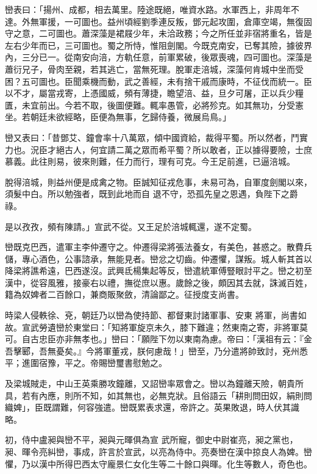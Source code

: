 \begin{pinyinscope}
 巒表曰：「揚州、成都，相去萬里。陸途既絕，唯資水路。水軍西上，非周年不達。外無軍援，一可圖也。益州頃經劉季連反叛，鄧元起攻圍，倉庫空竭，無復固守之意，二可圖也。蕭深藻是裙屐少年，未洽政務；今之所任並非宿將重名，皆是左右少年而已，三可圖也。蜀之所恃，惟阻劍閣。今既克南安，已奪其險，據彼界內，三分已一。從南安向涪，方軌任意，前軍累破，後眾喪魂，四可圖也。深藻是蕭衍兄子，骨肉至親，若其逃亡，當無死理。脫軍走涪城，深藻何肯城中坐而受困？五可圖也。臣聞乘機而動，武之善經，未有捨干戚而康時，不征伐而統一。臣
 以不才，屬當戎寄，上憑國威，頻有薄捷，瞻望涪、益，旦夕可屠，正以兵少糧匱，未宜前出。今若不取，後圖便難。輒率愚管，必將殄克。如其無功，分受憲坐。若朝廷未欲經略，臣便為無事，乞歸侍養，微展烏鳥。」



 巒又表曰：「昔鄧艾、鐘會率十八萬眾，傾中國資給，裁得平蜀。所以然者，鬥實力也。況臣才絕古人，何宜請二萬之眾而希平蜀？所以敢者，正以據得要險，士庶慕義。此往則易，彼來則難，任力而行，理有可克。今王足前進，已逼涪城。



 脫得涪城，則益州便是成禽之物。臣誠知征戎危事，未易可為，自軍度劍閣以來，須髮中白。所以勉強者，既到此地而自
 退不守，恐孤先皇之恩遇，負陛下之爵祿。



 是以孜孜，頻有陳請。」宣武不從。又王足於涪城輒還，遂不定蜀。



 巒既克巴西，遣軍主李仲遷守之。仲遷得梁將張法養女，有美色，甚惑之。散費兵儲，專心酒色，公事諮承，無能見者。巒忿之切齒。仲遷懼，謀叛。城人斬其首以降梁將譙希遠，巴西遂沒。武興氐楊集起等反，巒遣統軍傅豎眼討平之。巒之初至漢中，從容風雅，接豪右以禮，撫從庶以惠。歲餘之後，頗因其去就，誅滅百姓，籍為奴婢者二百餘口，兼商販聚斂，清論鄙之。征授度支尚書。



 時梁人侵軼徐、兗，朝廷乃以巒為使持節、都督東討諸軍事、安東
 將軍，尚書如故。宣武勞遺巒於東堂曰：「知將軍旋京未久，膝下難違；然東南之寄，非將軍莫可。自古忠臣亦非無孝也。」巒曰：「願陛下勿以東南為慮。帝曰：「漢祖有云：『金吾擊郾，吾無憂矣。』今將軍董戎，朕何慮哉！」巒至，乃分遣將帥致討，兗州悉平；進圍宿豫，平之。帝賜巒璽書慰勉之。



 及梁城賊走，中山王英乘勝攻鐘離，又詔巒率眾會之。巒以為鐘離天險，朝貴所具，若有內應，則所不知，如其無也，必無克狀。且俗語云「耕則問田奴，絹則問織婢」，臣既謂難，何容強遣。巒既累表求還，帝許之。英果敗退，時人伏其識略。



 初，侍中盧昶與巒不平，昶與元暉俱為宣
 武所寵，御史中尉崔亮，昶之黨也，昶、暉令亮糾巒，事成，許言於宣武，以亮為侍中。亮奏巒在漢中掠良人為婢。巒懼，乃以漢中所得巴西太守龐景仁女化生等二十餘口與暉。化生等數人，奇色也。




\end{pinyinscope}
